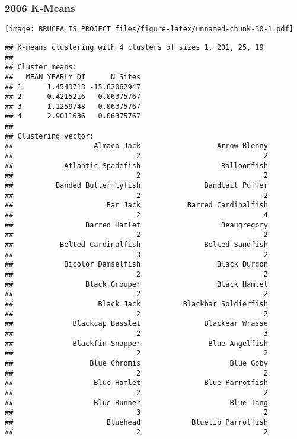 \documentclass[
]{article}
\begin{document}
\hypertarget{k-means-4}{%
\subsubsection{2006 K-Means}\label{k-means-4}}

\texttt{[image: BRUCEA\_IS\_PROJECT\_files/figure-latex/unnamed-chunk-30-1.pdf]}

\begin{verbatim}
## K-means clustering with 4 clusters of sizes 1, 201, 25, 19
## 
## Cluster means:
##   MEAN_YEARLY_DI      N_Sites
## 1      1.4543713 -15.62062947
## 2     -0.4215216   0.06375767
## 3      1.1259748   0.06375767
## 4      2.9011636   0.06375767
## 
## Clustering vector:
##                   Almaco Jack                  Arrow Blenny 
##                             2                             2 
##            Atlantic Spadefish                   Balloonfish 
##                             2                             2 
##          Banded Butterflyfish               Bandtail Puffer 
##                             2                             2 
##                      Bar Jack           Barred Cardinalfish 
##                             2                             4 
##                 Barred Hamlet                   Beaugregory 
##                             2                             2 
##           Belted Cardinalfish               Belted Sandfish 
##                             3                             2 
##            Bicolor Damselfish                  Black Durgon 
##                             2                             2 
##                 Black Grouper                  Black Hamlet 
##                             2                             2 
##                    Black Jack          Blackbar Soldierfish 
##                             2                             2 
##              Blackcap Basslet               Blackear Wrasse 
##                             2                             3 
##              Blackfin Snapper                Blue Angelfish 
##                             2                             2 
##                  Blue Chromis                     Blue Goby 
##                             2                             2 
##                   Blue Hamlet               Blue Parrotfish 
##                             2                             2 
##                   Blue Runner                     Blue Tang 
##                             3                             2 
##                      Bluehead            Bluelip Parrotfish 
##                             2                             2 

\end{verbatim}
\end{document}
